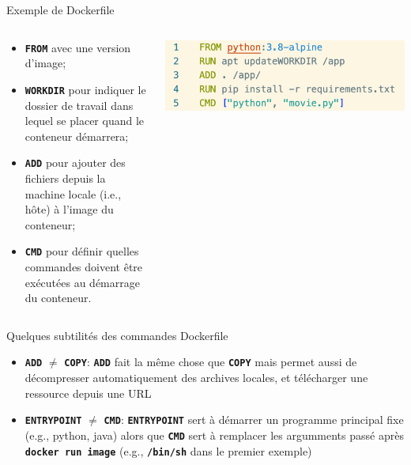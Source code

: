 \documentclass[aspectratio=169,10pt]{beamer}
\begin{document}
\begin{frame}{Exemple de Dockerfile}

\begin{columns}[T,onlytextwidth]
    \begin{column}{.45\linewidth}

    \begin{itemize}
        \item \texttt{\textbf{FROM}} avec une version d'image;
        \item \texttt{\textbf{WORKDIR}} pour indiquer le dossier de travail dans lequel se placer quand le conteneur démarrera; 
        \item \texttt{\textbf{ADD}} pour ajouter des fichiers depuis la machine locale (i.e., hôte) à l'image du conteneur;
        \item \texttt{\textbf{CMD}} pour définir quelles commandes doivent être exécutées au démarrage du conteneur.
    \end{itemize}
        
    \end{column}
    \begin{column}{.5\linewidth}
        \begin{center}
            \includegraphics[scale=0.4]{images/docker_simple2.png}
        \end{center}
    \end{column}
\end{columns}
\end{frame}

\begin{frame}{Quelques subtilités des commandes Dockerfile}
\begin{itemize}
    \item \texttt{\textbf{ADD}} $\neq$ \texttt{\textbf{COPY}}: \texttt{\textbf{ADD}} fait la même chose que \texttt{\textbf{COPY}} mais permet aussi de décompresser automatiquement des archives locales, et télécharger une ressource depuis une URL
    
    \vspace{1cm}
    
    \item \texttt{\textbf{ENTRYPOINT}} $\neq$ \texttt{\textbf{CMD}}: \texttt{\textbf{ENTRYPOINT}} sert à démarrer un programme principal fixe (e.g., python, java) alors que \texttt{\textbf{CMD}} sert à remplacer les argumments passé après \texttt{\textbf{docker run image}} (e.g., \texttt{\textbf{/bin/sh}} dans le premier exemple)
\end{itemize}

\end{frame}
\end{document}

